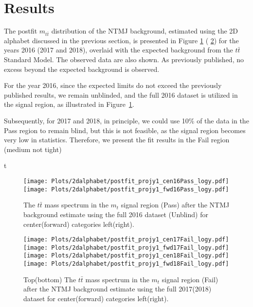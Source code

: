 

\section{Results}
\label{sec:results}



The postfit $m_{t\bar{t}}$ distribution of the NTMJ background, estimated using the 2D alphabet discussed in the previous section, is presented in Figure \ref{fig:mttbar_spectrum_2016} ( \ref{fig:mttbar_spectrum_20172018}) for the years 2016 (2017 and 2018), overlaid with the expected background from the $t\bar{t}$ Standard Model. The observed data are also shown. As previously published, no excess beyond the expected background is observed.

For the year 2016, since the expected limits do not exceed the previously published results, we remain unblinded, and the full 2016 dataset is utilized in the signal region, as illustrated in Figure~\ref{fig:mttbar_spectrum_2016}.

Subsequently, for 2017 and 2018, in principle, we could use 10\% of the data in the Pass region to remain blind, but this is not feasible, as the signal region becomes very low in statistics. Therefore, we present the fit results in the Fail region (medium not tight)

t

\begin{figure}[h!]
	
	\begin{center}
	     \texttt{[image: Plots/2dalphabet/postfit\_projy1\_cen16Pass\_logy.pdf]} 
	     \texttt{[image: Plots/2dalphabet/postfit\_projy1\_fwd16Pass\_logy.pdf]} 
		\caption{The  $t\bar{t}$ mass spectrum in the $m_{t}$ signal region (Pass) after the NTMJ background estimate using the full 2016 dataset (Unblind) for center(forward) categories left(right). }
		\label{fig:mttbar_spectrum_2016}
	\end{center}
\end{figure}

\begin{figure}[h!]
	
	\begin{center}
		\texttt{[image: Plots/2dalphabet/postfit\_projy1\_cen17Fail\_logy.pdf]} 
		\texttt{[image: Plots/2dalphabet/postfit\_projy1\_fwd17Fail\_logy.pdf]} \\
		
		\texttt{[image: Plots/2dalphabet/postfit\_projy1\_cen18Fail\_logy.pdf]} 
		\texttt{[image: Plots/2dalphabet/postfit\_projy1\_fwd18Fail\_logy.pdf]} \\
		
		\caption{Top(bottom) The  $t\bar{t}$ mass spectrum in the $m_{t}$ signal region (Fail)  after the NTMJ background estimate using the full 2017(2018) dataset for center(forward) categories left(right). }
		\label{fig:mttbar_spectrum_20172018}
	\end{center}
\end{figure}



